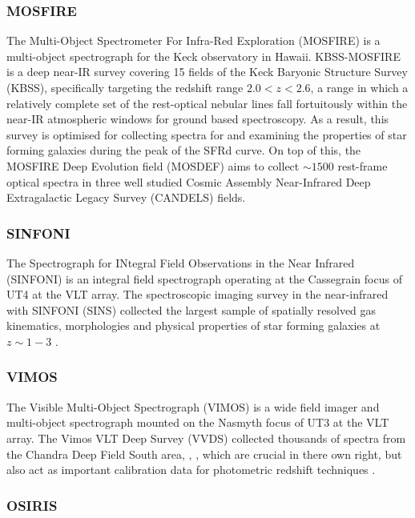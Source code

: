 \documentclass{literature}
\begin{document}
\subsubsection{MOSFIRE}\label{subsubsec:MOSFIRE}
The Multi-Object Spectrometer For Infra-Red Exploration (MOSFIRE) \citep{McLean2012} is a multi-object spectrograph for the Keck observatory in Hawaii. KBSS-MOSFIRE is a deep near-IR survey covering 15 fields of the Keck Baryonic Structure Survey (KBSS), specifically targeting the redshift range $2.0 < z < 2.6$, a range in which a relatively complete set of the rest-optical nebular lines fall fortuitously within the near-IR atmospheric windows for ground based spectroscopy. As a result, this survey is optimised for collecting spectra for and examining the properties of star forming galaxies during the peak of the SFRd curve. On top of this, the MOSFIRE Deep Evolution field (MOSDEF) \citep{Kriek2014}  aims to collect $\sim 1500$ rest-frame optical spectra in three well studied Cosmic Assembly Near-Infrared Deep Extragalactic Legacy Survey (CANDELS) \citep{Grogin2011} fields.

\subsubsection{SINFONI}\label{subsubsec:SINFONI}
The Spectrograph for INtegral Field Observations in the Near Infrared (SINFONI) \citep{Eisenhauer2003} is an integral field spectrograph operating at the Cassegrain focus of UT4 at the VLT array. The spectroscopic imaging survey in the near-infrared with SINFONI (SINS) collected the largest sample of spatially resolved gas kinematics, morphologies and physical properties of star forming galaxies at $z \sim 1-3$ \citep{ForsterSchreiber2009}. 

\subsubsection{VIMOS}\label{subsubsec:VIMOS}
The Visible Multi-Object Spectrograph (VIMOS) \citep{LeFevre2003} is a wide field imager and multi-object spectrograph mounted on the Nasmyth focus of UT3 at the VLT array. The Vimos VLT Deep Survey (VVDS) collected thousands of spectra from the Chandra Deep Field South area, \citep{LeFvre2004}, \citep{LeFevre2005}, which are crucial in there own right, but also act as important calibration data for photometric redshift techniques \citep{Ilbert2006}.

\subsubsection{OSIRIS}\label{subsubsec:OSIRIS}
\end{document}
